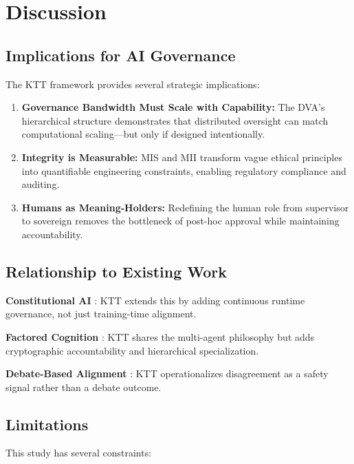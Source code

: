 \documentclass[11pt,letterpaper]{article}
\begin{document}
\section{Discussion}
\label{sec:discussion}

\subsection{Implications for AI Governance}

The KTT framework provides several strategic implications:

\begin{enumerate}
    \item \textbf{Governance Bandwidth Must Scale with Capability:} The DVA's hierarchical structure demonstrates that distributed oversight can match computational scaling—but only if designed intentionally.
    
    \item \textbf{Integrity is Measurable:} MIS and MII transform vague ethical principles into quantifiable engineering constraints, enabling regulatory compliance and auditing.
    
    \item \textbf{Humans as Meaning-Holders:} Redefining the human role from supervisor to sovereign removes the bottleneck of post-hoc approval while maintaining accountability.
\end{enumerate}

\subsection{Relationship to Existing Work}

\textbf{Constitutional AI} \citep{bai2022constitutional}: KTT extends this by adding continuous runtime governance, not just training-time alignment.

\textbf{Factored Cognition} \citep{christiano2018amplifying}: KTT shares the multi-agent philosophy but adds cryptographic accountability and hierarchical specialization.

\textbf{Debate-Based Alignment} \citep{irving2018ai}: KTT operationalizes disagreement as a safety signal rather than a debate outcome.

\subsection{Limitations}

This study has several constraints:
\end{document}
